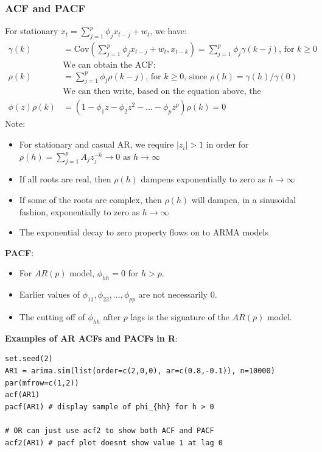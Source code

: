 \documentclass[11pt]{article}
\newcommand{\noi}{\noindent}
\begin{document}
\subsubsection{ACF and PACF}
\noi For stationary $x_t = \sum_{j=1}^p{\phi_jx_{t-j} + w_t}$, we have:
\begin{align*}
    \gamma(k) &= \text{Cov}(\sum_{j=1}^{p}{\phi_jx_{t-j} + w_t, x_{t-k}}) = \sum_{j=1}^{p}\phi_j \gamma(k-j) \text{, for } k \geq 0 \\
    &\text{We can obtain the ACF}: \\
    \rho(k) &= \sum_{j=1}^{p}{\phi_j \rho(k-j)} \text{, for } k \geq 0 \text{, since } \rho(h) = \gamma(h)/\gamma(0) \\
    &\text{We can then write, based on the equation above, the characteristic polynomial} \\
    \phi(z)\rho(k) &= (1-\phi_1z - \phi_2z^2 - ... - \phi_p z^p)\rho(k) = 0
\end{align*} \phantom{i}
\noi Note:
\begin{itemize}
    \item For stationary and casual AR, we require $|z_i| > 1$ in order for $\rho(h) = \sum_{j=1}^p{A_jz_j^{-h}} \rightarrow 0 \text{ as } h \rightarrow \infty$
    \item If all roots are real, then $\rho(h)$ dampens exponentially to zero as $h \rightarrow \infty$
    \item If some of the roots are complex, then $\rho(h)$ will dampen, in a sinusoidal fashion, exponentially to zero as $h \rightarrow \infty$
    \item The exponential decay to zero property flows on to ARMA models
\end{itemize} \phantom{i}

\noi \textbf{PACF}:
\begin{itemize}
    \item For $AR(p)$ model, $\phi_{hh} = 0$ for $h > p$.
    \item Earlier values of $\phi_{11}, \phi_{22},...,\phi_{pp}$ are not necessarily $0$.
    \item The cutting off of $\phi_{hh}$ after $p$ lags is the signature of the $AR(p)$ model.
\end{itemize} \phantom{i}

\noi \textbf{Examples of AR ACFs and PACFs in R}:
\begin{lstlisting}
set.seed(2)
AR1 = arima.sim(list(order=c(2,0,0), ar=c(0.8,-0.1)), n=10000)
par(mfrow=c(1,2))
acf(AR1)
pacf(AR1) # display sample of phi_{hh} for h > 0

# OR can just use acf2 to show both ACF and PACF
acf2(AR1) # pacf plot doesnt show value 1 at lag 0
\end{lstlisting}
\end{document}
